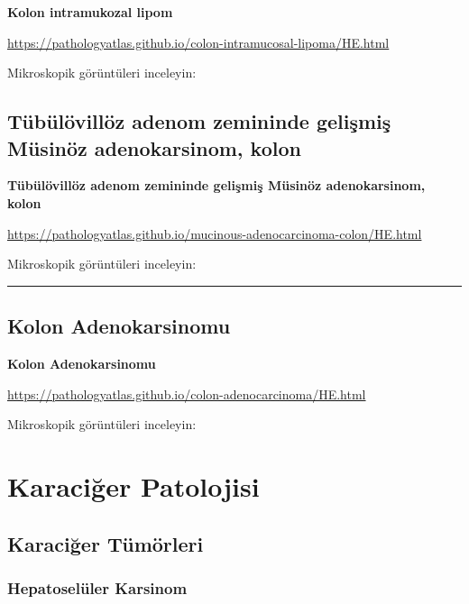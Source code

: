 \documentclass[
  letterpaper,
  DIV=11,
  numbers=noendperiod]{scrreprt}
\begin{document}
\textbf{Kolon intramukozal lipom}

\url{https://pathologyatlas.github.io/colon-intramucosal-lipoma/HE.html}

Mikroskopik görüntüleri inceleyin:

\hypertarget{tuxfcbuxfcluxf6villuxf6z-adenom-zemininde-geliux15fmiux15f-muxfcsinuxf6z-adenokarsinom-kolon}{%
\chapter{Tübülövillöz adenom zemininde gelişmiş Müsinöz adenokarsinom,
kolon}\label{tuxfcbuxfcluxf6villuxf6z-adenom-zemininde-geliux15fmiux15f-muxfcsinuxf6z-adenokarsinom-kolon}}

\textbf{Tübülövillöz adenom zemininde gelişmiş Müsinöz adenokarsinom,
kolon}

\url{https://pathologyatlas.github.io/mucinous-adenocarcinoma-colon/HE.html}

Mikroskopik görüntüleri inceleyin:

\begin{center}\rule{0.5\linewidth}{0.5pt}\end{center}

\hypertarget{kolon-adenokarsinomu}{%
\chapter{Kolon Adenokarsinomu}\label{kolon-adenokarsinomu}}

\textbf{Kolon Adenokarsinomu}

\url{https://pathologyatlas.github.io/colon-adenocarcinoma/HE.html}

Mikroskopik görüntüleri inceleyin:

\part{Karaciğer Patolojisi}

\hypertarget{karaciux11fer-tuxfcmuxf6rleri}{%
\chapter{Karaciğer Tümörleri}\label{karaciux11fer-tuxfcmuxf6rleri}}

\hypertarget{hepatoseluxfcler-karsinom}{%
\section{Hepatoselüler Karsinom}\label{hepatoseluxfcler-karsinom}}
\end{document}

